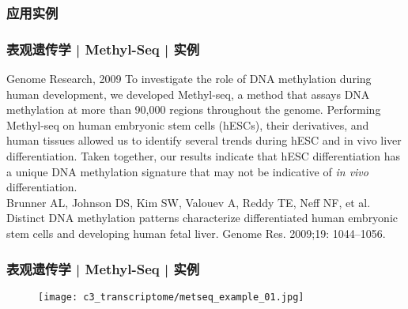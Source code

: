 \subsubsection{应用实例}
\begin{frame}
  \frametitle{表观遗传学 | Methyl-Seq | 实例}
  \begin{block}{Genome Research, 2009}
    To investigate the role of DNA methylation during human development, we developed Methyl-seq, a method that assays DNA methylation at more than 90,000 regions throughout the genome. Performing Methyl-seq on human embryonic stem cells (hESCs), their derivatives, and human tissues allowed us to identify several trends during hESC and in vivo liver differentiation. Taken together, our results indicate that hESC differentiation has a unique DNA methylation signature that may not be indicative of \textit{in vivo} differentiation.\\
    \vspace{0.5em}
    Brunner AL, Johnson DS, Kim SW, Valouev A, Reddy TE, Neff NF, et al. Distinct DNA methylation patterns characterize differentiated human embryonic stem cells and developing human fetal liver. Genome Res. 2009;19: 1044–1056.
  \end{block}
\end{frame}

\begin{frame}
  \frametitle{表观遗传学 | Methyl-Seq | 实例}
  \begin{figure}
    \centering
    \texttt{[image: c3\_transcriptome/metseq\_example\_01.jpg]}
  \end{figure}
\end{frame}

